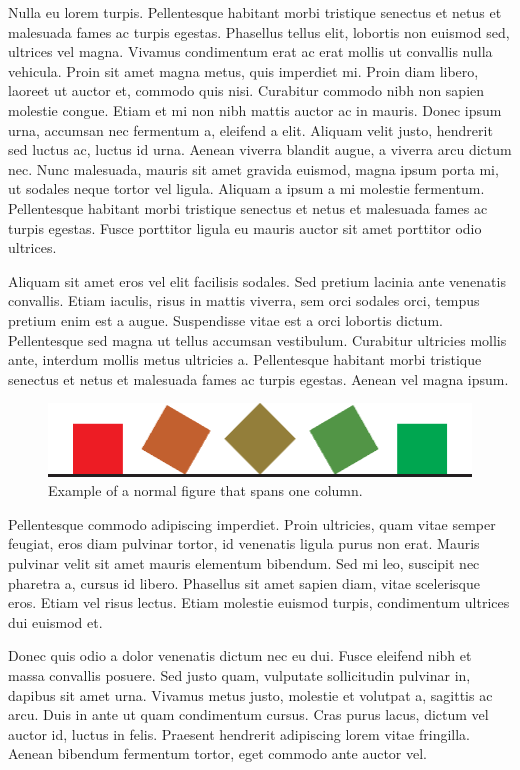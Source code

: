 \documentclass[submission]{gmp2015}
\begin{document}
Nulla eu lorem turpis. Pellentesque habitant morbi tristique senectus et netus et malesuada fames ac turpis egestas. Phasellus tellus elit, lobortis non euismod sed, ultrices vel magna. Vivamus condimentum erat ac erat mollis ut convallis nulla vehicula. Proin sit amet magna metus, quis imperdiet mi. Proin diam libero, laoreet ut auctor et, commodo quis nisi. Curabitur commodo nibh non sapien molestie congue. Etiam et mi non nibh mattis auctor ac in mauris. Donec ipsum urna, accumsan nec fermentum a, eleifend a elit. Aliquam velit justo, hendrerit sed luctus ac, luctus id urna. Aenean viverra blandit augue, a viverra arcu dictum nec. Nunc malesuada, mauris sit amet gravida euismod, magna ipsum porta mi, ut sodales neque tortor vel ligula. Aliquam a ipsum a mi molestie fermentum. Pellentesque habitant morbi tristique senectus et netus et malesuada fames ac turpis egestas. Fusce porttitor ligula eu mauris auctor sit amet porttitor odio ultrices.

Aliquam sit amet eros vel elit facilisis sodales. Sed pretium lacinia ante venenatis convallis. Etiam iaculis, risus in mattis viverra, sem orci sodales orci, tempus pretium enim est a augue. Suspendisse vitae est a orci lobortis dictum. Pellentesque sed magna ut tellus accumsan vestibulum. Curabitur ultricies mollis ante, interdum mollis metus ultricies a. Pellentesque habitant morbi tristique senectus et netus et malesuada fames ac turpis egestas. Aenean vel magna ipsum.

\begin{figure}\centering
  \includegraphics[scale=.5]{example.eps}
  \caption{Example of a normal figure that spans one column.}
  \label{fig:square}
\end{figure}

Pellentesque commodo adipiscing imperdiet. Proin ultricies, quam vitae semper feugiat, eros diam pulvinar tortor, id venenatis ligula purus non erat. Mauris pulvinar velit sit amet mauris elementum bibendum. Sed mi leo, suscipit nec pharetra a, cursus id libero. Phasellus sit amet sapien diam, vitae scelerisque eros. Etiam vel risus lectus. Etiam molestie euismod turpis, condimentum ultrices dui euismod et.

Donec quis odio a dolor venenatis dictum nec eu dui. Fusce eleifend nibh et massa convallis posuere. Sed justo quam, vulputate sollicitudin pulvinar in, dapibus sit amet urna. Vivamus metus justo, molestie et volutpat a, sagittis ac arcu. Duis in ante ut quam condimentum cursus. Cras purus lacus, dictum vel auctor id, luctus in felis. Praesent hendrerit adipiscing lorem vitae fringilla. Aenean bibendum fermentum tortor, eget commodo ante auctor vel.
\end{document}
